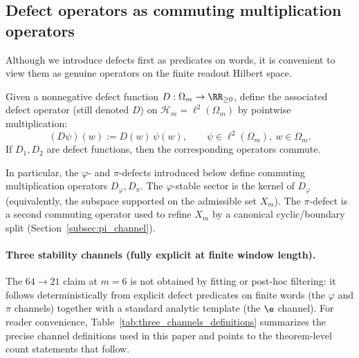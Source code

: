 \subsection{Defect operators as commuting multiplication operators}
\label{subsec:defect_operators}

Although we introduce defects first as predicates on words, it is convenient to view them as genuine operators on the finite readout Hilbert space.

\begin{definition}\label{def:defect_ops}
Given a nonnegative defect function $D:\Omega_m\to\RR_{\ge 0}$, define the associated defect operator (still denoted $D$) on $\mathcal{H}_m=\ell^2(\Omega_m)$ by pointwise multiplication:
\[
(D\psi)(w):=D(w)\,\psi(w),\qquad \psi\in\ell^2(\Omega_m),\ w\in\Omega_m.
\]
If $D_1,D_2$ are defect functions, then the corresponding operators commute.
\end{definition}

In particular, the $\varphi$- and $\pi$-defects introduced below define commuting multiplication operators $D_\varphi,D_\pi$.
The $\varphi$-stable sector is the kernel of $D_\varphi$ (equivalently, the subspace supported on the admissible set $X_m$).
The $\pi$-defect is a second commuting operator used to refine $X_m$ by a canonical cyclic/boundary split (Section~\ref{subsec:pi_channel}).

\paragraph{Three stability channels (fully explicit at finite window length).}
The $64\to 21$ claim at $m=6$ is not obtained by fitting or post-hoc filtering: it follows deterministically from explicit defect predicates on finite words (the $\varphi$ and $\pi$ channels) together with a standard analytic template (the $\e$ channel).
For reader convenience, Table~\ref{tab:three_channels_definitions} summarizes the precise channel definitions used in this paper and points to the theorem-level count statements that follow.


